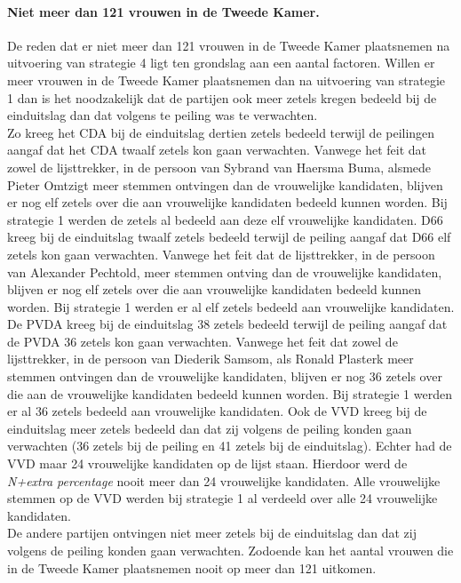 \paragraph{Niet meer dan 121 vrouwen in de Tweede Kamer.}
De reden dat er niet meer dan 121 vrouwen in de Tweede Kamer plaatsnemen na uitvoering van strategie 4 ligt ten grondslag aan een aantal factoren. Willen er meer vrouwen in de Tweede Kamer plaatsnemen dan na uitvoering van strategie 1 dan is het noodzakelijk dat de partijen ook meer zetels kregen bedeeld bij de einduitslag dan dat volgens te peiling was te verwachten. 
\\
\indent Zo kreeg het CDA bij de einduitslag dertien zetels bedeeld terwijl de peilingen aangaf dat het CDA twaalf zetels kon gaan verwachten. Vanwege het feit dat zowel de lijsttrekker, in de persoon van Sybrand van Haersma Buma, alsmede Pieter Omtzigt meer stemmen ontvingen dan de vrouwelijke kandidaten, blijven er nog elf zetels over die aan vrouwelijke kandidaten bedeeld kunnen worden. Bij strategie 1 werden de zetels al bedeeld aan deze elf vrouwelijke kandidaten.
D66 kreeg bij de einduitslag twaalf zetels bedeeld terwijl de peiling aangaf dat D66 elf zetels kon gaan verwachten. Vanwege het feit dat de lijsttrekker, in de persoon van Alexander Pechtold, meer stemmen ontving dan de vrouwelijke kandidaten, blijven er nog elf zetels over die aan vrouwelijke kandidaten bedeeld kunnen worden. Bij strategie 1 werden er al elf zetels bedeeld aan vrouwelijke kandidaten. De PVDA kreeg bij de einduitslag 38 zetels bedeeld terwijl de peiling aangaf dat de PVDA 36 zetels kon gaan verwachten. Vanwege het feit dat zowel de lijsttrekker, in de persoon van Diederik Samsom, als Ronald Plasterk meer stemmen ontvingen dan de vrouwelijke kandidaten, blijven er nog 36 zetels over die aan de vrouwelijke kandidaten bedeeld kunnen worden. Bij strategie 1 werden er al 36 zetels bedeeld aan vrouwelijke kandidaten. Ook de VVD kreeg bij de einduitslag meer zetels bedeeld dan dat zij volgens de peiling konden gaan verwachten (36 zetels bij de peiling en 41 zetels bij de einduitslag). Echter had de VVD maar 24 vrouwelijke kandidaten op de lijst staan. Hierdoor werd de \textit{N+extra percentage} nooit meer dan 24 vrouwelijke kandidaten. Alle vrouwelijke stemmen op de VVD werden bij strategie 1 al verdeeld over alle 24 vrouwelijke kandidaten. 
\\
\indent De andere partijen ontvingen niet meer zetels bij de einduitslag dan dat zij volgens de peiling konden gaan verwachten. Zodoende kan het aantal vrouwen die in de Tweede Kamer plaatsnemen nooit op meer dan 121 uitkomen.   





